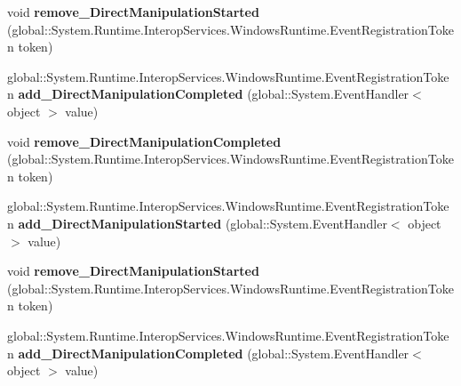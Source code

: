 \begin{DoxyCompactItemize}
void {\bfseries remove\+\_\+\+Direct\+Manipulation\+Started} (global\+::\+System.\+Runtime.\+Interop\+Services.\+Windows\+Runtime.\+Event\+Registration\+Token token)
\item 
\mbox{\label{interface_windows_1_1_u_i_1_1_xaml_1_1_controls_1_1_i_scroll_viewer3_a111ec1d571f2a6f03d6e721b6314de30}} 
global\+::\+System.\+Runtime.\+Interop\+Services.\+Windows\+Runtime.\+Event\+Registration\+Token {\bfseries add\+\_\+\+Direct\+Manipulation\+Completed} (global\+::\+System.\+Event\+Handler$<$ object $>$ value)
\item 
\mbox{\label{interface_windows_1_1_u_i_1_1_xaml_1_1_controls_1_1_i_scroll_viewer3_ac49adea893c6168aba5af298913c0b69}} 
void {\bfseries remove\+\_\+\+Direct\+Manipulation\+Completed} (global\+::\+System.\+Runtime.\+Interop\+Services.\+Windows\+Runtime.\+Event\+Registration\+Token token)
\item 
\mbox{\label{interface_windows_1_1_u_i_1_1_xaml_1_1_controls_1_1_i_scroll_viewer3_a0839b9502b9866f437c3f3f23c2c0f79}} 
global\+::\+System.\+Runtime.\+Interop\+Services.\+Windows\+Runtime.\+Event\+Registration\+Token {\bfseries add\+\_\+\+Direct\+Manipulation\+Started} (global\+::\+System.\+Event\+Handler$<$ object $>$ value)
\item 
\mbox{\label{interface_windows_1_1_u_i_1_1_xaml_1_1_controls_1_1_i_scroll_viewer3_a75d6c9a9bf666134494a9293cd9bfa83}} 
void {\bfseries remove\+\_\+\+Direct\+Manipulation\+Started} (global\+::\+System.\+Runtime.\+Interop\+Services.\+Windows\+Runtime.\+Event\+Registration\+Token token)
\item 
\mbox{\label{interface_windows_1_1_u_i_1_1_xaml_1_1_controls_1_1_i_scroll_viewer3_a111ec1d571f2a6f03d6e721b6314de30}} 
global\+::\+System.\+Runtime.\+Interop\+Services.\+Windows\+Runtime.\+Event\+Registration\+Token {\bfseries add\+\_\+\+Direct\+Manipulation\+Completed} (global\+::\+System.\+Event\+Handler$<$ object $>$ value)
\item 
\mbox{\label{interface_windows_1_1_u_i_1_1_xaml_1_1_controls_1_1_i_scroll_viewer3_ac49adea893c6168aba5af298913c0b69}} 

\end{DoxyCompactItemize}
